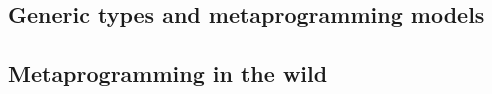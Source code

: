 
    
    
         
\subsection{Generic types and metaprogramming models}


\subsection{Metaprogramming in the wild}
